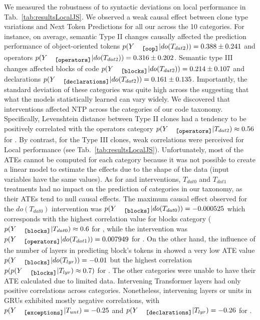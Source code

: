We measured the robustness of \nlms to syntactic deviations on local performance in Tab.~\ref{tab:resultsLocalJS}. We observed a weak causal effect between clone type variations and Next Token Predictions for all our \nlms across the 10 categories. For instance, on average, semantic Type II changes causally affected the prediction performance of object-oriented tokens $p(Y_{\oop}|do(T_{dat2}))=0.388\pm0.241$ and operators $p(Y_{\operators}|do(T_{dat2}))=0.316\pm0.202$. Semantic type III changes affected blocks of code $p(Y_{\blocks}|do(T_{dat2}))=0.214\pm0.107 $ and declarations $p(Y_{\declarations}|do(T_{dat2}))=0.161\pm0.135$. Importantly, the standard deviation of these categories was quite high across the \nlms suggesting that what the models statistically learned can vary widely. We discovered that \datainterII interventions affected NTP across the categories of our code taxonomy. Specifically, Levenshtein distance between Type II clones had a tendency to be positively correlated with the operators category $p(Y_{\operators}|T_{dat2})\approx0.56$ for \gru. By contrast, for the Type III clones, weak correlations were perceived for Local performance (see Tab.~\ref{tab:resultsLocalJS}). Unfortunately, most of the ATEs cannot be computed for each category because it was not possible to create a linear model to estimate the effects due to the shape of the data (\ie input variables have the same values). As for \datainterI and \datainterIII interventions, $T_{dat0}$ and $T_{dat1}$ treatments had no impact on the prediction of categories in our taxonomy, as their ATEs tend to null causal effects. The maximum causal effect observed for the $do(T_{dat0})$ intervention was $p(Y_{\blocks}|do(T_{dat0}))=-0.000525$ which corresponds with the highest correlation value for blocks category ($p(Y_{\blocks}|T_{dat0})\approx0.6$ for \gru, while the \datainterIII intervention was  $p(Y_{\operators}|do(T_{dat1}))=0.007949$ for \tf. On the other hand, the influence of the number of layers in predicting block's tokens in \gru showed a very low ATE value $p(Y_{\blocks}|do(T_{lyr}))=-0.01$ but the highest correlation $p(p(Y_{\blocks}|T_{lyr})\approx0.7)$ for \tf. The other categories were unable to have their ATE calculated due to limited data. Intervening Transformer layers had only positive correlations across categories. Nonetheless, intervening layers or units in GRUs exhibited mostly negative correlations, with $p(Y_{\exceptions}|T_{unt})=-0.25$ and $p(Y_{\declarations}|T_{lyr})=-0.26$ for \gru.


